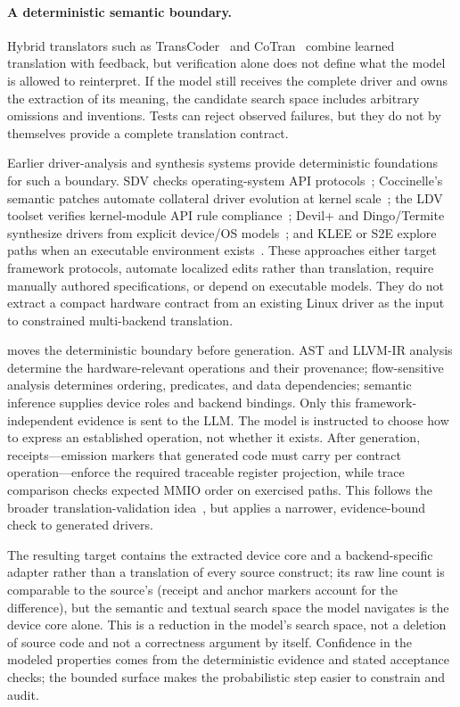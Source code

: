 \paragraph{A deterministic semantic boundary.} Hybrid translators such as
TransCoder~\cite{lachaux2020transcoder} and CoTran~\cite{jana2024cotran}
combine learned translation with feedback, but verification alone does not
define what the model is allowed to reinterpret. If the model still receives
the complete driver and owns the extraction of its meaning, the candidate search
space includes arbitrary omissions and inventions. Tests can reject observed
failures, but they do not by themselves provide a complete translation contract.

Earlier driver-analysis and synthesis systems provide deterministic foundations for such a boundary. SDV checks operating-system API protocols~\cite{ball2006thorough}; Coccinelle's semantic patches automate collateral driver evolution at kernel scale~\cite{padioleau2007semantic,lawall2018coccinelle}; the LDV toolset verifies kernel-module API rule compliance~\cite{zakharov2015ldv}; Devil+ and Dingo/Termite synthesize drivers from explicit device/OS models~\cite{yu2005devil,ryzhyk2009dingo,ryzhyk2009termite,ryzhyk2014termite2}; and KLEE or S2E explore paths when an executable environment exists~\cite{cadar2008klee,chipounov2011s2e}. These approaches either target framework protocols, automate localized edits rather than translation, require manually authored specifications, or depend on executable models. They do not extract a compact hardware contract from an existing Linux driver as the input to constrained multi-backend translation.

\reharness{} moves the deterministic boundary before generation. AST and LLVM-IR
analysis determine the hardware-relevant operations and their provenance;
flow-sensitive analysis determines ordering, predicates, and data dependencies;
semantic inference supplies device roles and backend bindings. Only this
framework-independent evidence is sent to the LLM. The model is instructed to
choose how to express an established operation, not whether it exists. After
generation, receipts---emission markers that generated code must carry per
contract operation---enforce the required traceable register projection, while
trace comparison checks expected MMIO order on exercised paths. This follows the
broader translation-validation idea~\cite{barthe2009certificate,kang2018crellvm,lopes2021alive2},
but applies a narrower, evidence-bound check to generated drivers.

The resulting target contains the extracted device core and a backend-specific adapter rather than a translation of every source construct; its raw line count is comparable to the source's (receipt and anchor markers account for the difference), but the semantic and textual search space the model navigates is the device core alone. This is a reduction in the model's search space, not a deletion of source code and not a correctness argument by itself. Confidence in the modeled properties comes from the deterministic evidence and stated acceptance checks; the bounded surface makes the probabilistic step easier to constrain and audit.
